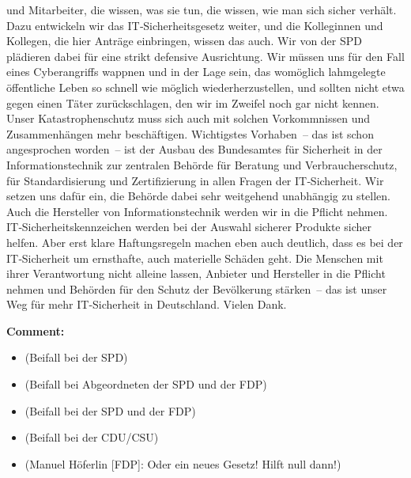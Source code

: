 \documentclass{article}
\begin{document}
und Mitarbeiter, die wissen, was sie tun, die wissen, wie man sich sicher verhält. Dazu entwickeln wir das IT‑Sicherheitsgesetz weiter, und die Kolleginnen und Kollegen, die hier Anträge einbringen, wissen das auch. Wir von der SPD plädieren dabei für eine strikt defensive Ausrichtung. Wir müssen uns für den Fall eines Cyberangriffs wappnen und in der Lage sein, das womöglich lahmgelegte öffentliche Leben so schnell wie möglich wiederherzustellen, und sollten nicht etwa gegen einen Täter zurückschlagen, den wir im Zweifel noch gar nicht kennen. Unser Katastrophenschutz muss sich auch mit solchen Vorkommnissen und Zusammenhängen mehr beschäftigen. Wichtigstes Vorhaben – das ist schon angesprochen worden – ist der Ausbau des Bundesamtes für Sicherheit in der Informationstechnik zur zentralen Behörde für Beratung und Verbraucherschutz, für Standardisierung und Zertifizierung in allen Fragen der IT‑Sicherheit. Wir setzen uns dafür ein, die Behörde dabei sehr weitgehend unabhängig zu stellen.  Auch die Hersteller von Informationstechnik werden wir in die Pflicht nehmen. IT‑Sicherheitskennzeichen werden bei der Auswahl sicherer Produkte sicher helfen. Aber erst klare Haftungsregeln machen eben auch deutlich, dass es bei der IT‑Sicherheit um ernsthafte, auch materielle Schäden geht. Die Menschen mit ihrer Verantwortung nicht alleine lassen, Anbieter und Hersteller in die Pflicht nehmen und Behörden für den Schutz der Bevölkerung stärken – das ist unser Weg für mehr IT‑Sicherheit in Deutschland. Vielen Dank.  

\noindent\textbf{Comment:}
\begin{itemize}
    \setlength\itemsep{-3pt}
    \item (Beifall bei der SPD)
    \setlength\itemsep{-3pt}
    \item (Beifall bei Abgeordneten der SPD und der FDP)
    \setlength\itemsep{-3pt}
    \item (Beifall bei der SPD und der FDP)
    \setlength\itemsep{-3pt}
    \item (Beifall bei der CDU/CSU)
    \setlength\itemsep{-3pt}
    \item (Manuel Höferlin [FDP]: Oder ein neues Gesetz! Hilft null dann!)
\end{itemize}
\end{document}
